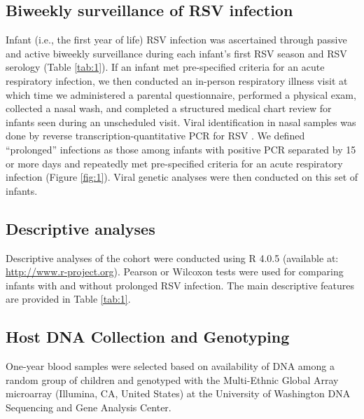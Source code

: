 \documentclass{article} %
\begin{document}
\subsection{Biweekly surveillance of RSV infection}
Infant (i.e., the first year of life) RSV infection was ascertained through passive and active biweekly surveillance during each infant's first RSV season and RSV serology
(Table \ref{tab:1}).
If an infant met pre-specified criteria for an acute respiratory infection, we then conducted an in-person respiratory illness visit at which time we administered a parental questionnaire, performed a physical exam, collected a nasal wash, and completed a structured medical chart review for infants seen during an unscheduled visit. 
Viral identification in nasal samples was done by reverse transcription-quantitative PCR for RSV
\citep{larkin2015objectives}. 
We defined ``prolonged'' infections as those among infants with positive PCR separated by 15 or more days and repeatedly met pre-specified criteria for an acute respiratory infection 
(Figure \ref{fig:1}).
Viral genetic analyses were then conducted on this set of infants.

\subsection{Descriptive analyses}
Descriptive analyses of the cohort were conducted using R 4.0.5 (available at: 
\url{http://www.r-project.org}). 
Pearson or Wilcoxon tests were used for comparing infants with and without prolonged RSV infection.
The main descriptive features are provided in 
Table \ref{tab:1}.

\subsection{Host DNA Collection and Genotyping}
One-year blood samples were selected based on availability of DNA among a random group of children and genotyped with the Multi-Ethnic Global Array microarray (Illumina, CA, United States) at the University of Washington DNA Sequencing and Gene Analysis Center.
\end{document}
